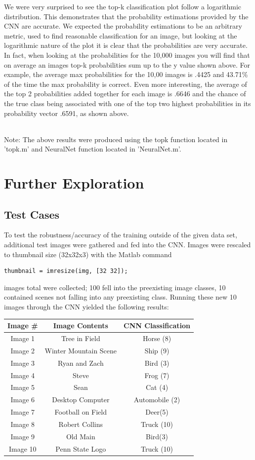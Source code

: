 \documentclass[11pt,english]{article}
\begin{document}
      We were very surprised to see the top-k classification plot follow a logarithmic distribution. This demonstrates that the probability estimations provided by the CNN are accurate. We expected the probability estimations to be an arbitrary metric, used to find reasonable classification for an image, but looking at the logarithmic nature of the plot it is clear that the probabilities are very accurate. In fact, when looking at the probabilities for the 10,000 images you will find that on average an images top-k probabilities sum up to the y value shown above. For example, the average max probabilities for the 10,00 images is .4425 and 43.71\% of the time the max probability is correct. Even more interesting, the average of the top 2 probabilities added together for each image is .6646 and the chance of the true class being associated with one of the top two highest probabilities in its probability vector .6591, as shown above.

	~\\
	\noindent
	Note: The above results were produced using the topk function located in 'topk.m' and NeuralNet function located in 'NeuralNet.m'.

\section{Further Exploration}
\subsection{Test Cases}
To test the robustness/accuracy of the training outside of the given data set, additional test images were gathered and fed into the CNN.  Images were rescaled to thumbnail size (32x32x3) with the Matlab command
\begin{lstlisting}
thumbnail = imresize(img, [32 32]);
\end{lstlisting}

 images total were collected; 100 fell into the preexisting image classes, 10 contained scenes not falling into any preexisting class.  Running these new 10 images through the CNN yielded the following results:\\

\begin{tabular}{ | c | c | c |}
  \hline
  Image \# & Image Contents & CNN Classification \\
  \hline		
  Image 1 & Tree in Field & Horse (8) \\
  Image 2 & Winter Mountain Scene & Ship (9) \\
  Image 3 & Ryan and Zach & Bird (3) \\
  Image 4 & Steve & Frog (7) \\
  Image 5 & Sean & Cat (4) \\
  Image 6 & Desktop Computer & Automobile (2) \\
  Image 7 & Football on Field & Deer(5) \\
  Image 8 & Robert Collins & Truck (10) \\
  Image 9 & Old Main & Bird(3) \\
  Image 10 & Penn State Logo & Truck (10)\\
  \hline  
\end{tabular}
\end{document}

